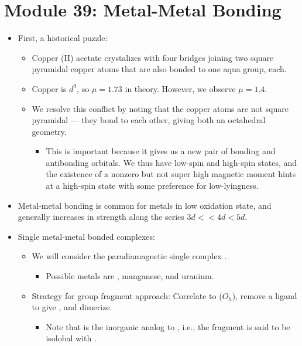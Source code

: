 \documentclass[../notes.tex]{subfiles}
\begin{document}
\section{Module 39: Metal-Metal Bonding}
\begin{itemize}
    \item First, a historical puzzle:
    \begin{itemize}
        \item Copper (II) acetate crystalizes with four  bridges joining two square pyramidal copper atoms that are also bonded to one aqua group, each.
        \item Copper is $d^9$, so $\mu=1.73$ in theory. However, we observe $\mu=1.4$.
        \item We resolve this conflict by noting that the copper atoms are not square pyramidal --- they bond to each other, giving both an octahedral geometry.
        \begin{itemize}
            \item This is important because it gives us a new pair of bonding and antibonding orbitals. We thus have low-spin and high-spin states, and the existence of a nonzero but not super high magnetic moment hints at a high-spin state with some preference for low-lyingness.
        \end{itemize}
    \end{itemize}
    \item Metal-metal bonding is common for metals in low oxidation state, and generally increases in strength along the series $3d<<4d<5d$.
    \item Single metal-metal bonded complexes:
    \begin{itemize}
        \item We will consider the paradiamagnetic single  complex .
        \begin{itemize}
            \item Possible metals are , manganese, and uranium.
        \end{itemize}
        \item Strategy for group fragment approach: Correlate to  ($O_h$), remove a ligand to give , and dimerize.
        \begin{itemize}
            \item Note that  is the inorganic analog to , i.e., the  fragment is said to be isolobal with .
        \end{itemize}

\end{itemize}
\end{itemize}
\end{document}
